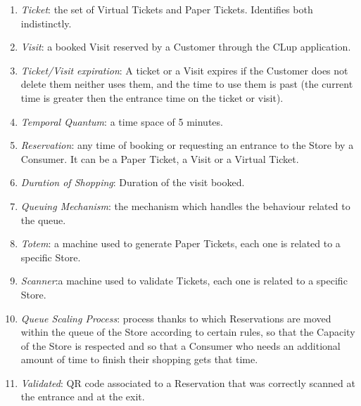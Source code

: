 \documentclass[a4paper, 12pt, oneside, table]{article}
\begin{document}
\begin{enumerate}[label={D.\arabic{*}}]
\item \label{def:ticket}\textit{Ticket}: the set of Virtual Tickets and Paper Tickets. Identifies both indistinctly.
\item \label{def:visit}\textit{Visit}: a booked Visit reserved by a Customer through the CLup application.
\item \label{def:expires}\textit{Ticket/Visit expiration}: A ticket or a Visit expires if the Customer does not delete them neither uses them, and the time to use them is past (the current time is greater then the entrance time on the ticket or visit).
\item \label{def:temporalQuantum}\textit{Temporal Quantum}: a time space of 5 minutes.
\item \label{def:reservation}\textit{Reservation}: any time of booking or requesting an entrance to the Store by a Consumer. It can be a Paper Ticket, a Visit or a Virtual Ticket.
\item \label{def:duration}\textit{Duration of Shopping}: Duration of the visit booked.
\item \label{def:queueing}\textit{Queuing Mechanism}: the mechanism which handles the behaviour related to the queue.
\item \label{def:totem}\textit{Totem}: a machine used to generate Paper Tickets, each one is related to a specific Store.
\item \label{def:scanner}\textit{Scanner}:a machine used to validate Tickets, each one is related to a specific Store.
\item \label{def:queuescaling}\textit{Queue Scaling Process}: process thanks to which Reservations are moved within the queue of the Store according to certain rules, so that the Capacity of the Store is respected and so that a Consumer who needs an additional amount of time to finish their shopping gets that time.
\item \label{def:validated}\textit{Validated}: QR code associated to a Reservation that was correctly scanned at the entrance and at the exit.
\end{enumerate}
\end{document}
